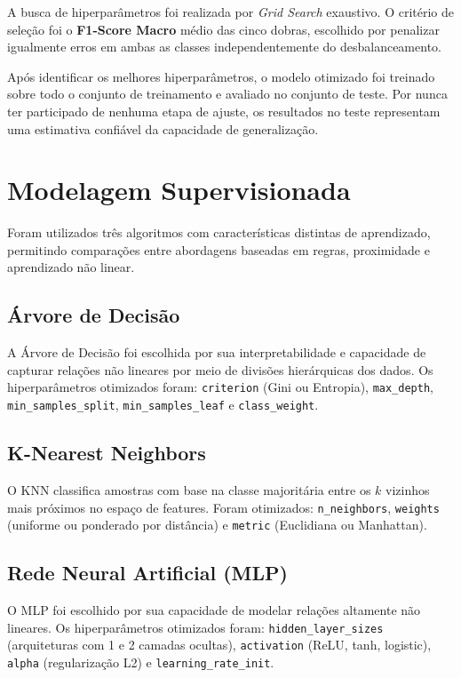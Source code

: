 \documentclass[12pt, a4paper]{article}
\begin{document}
A busca de hiperparâmetros foi realizada por \textit{Grid Search} exaustivo.
O critério de seleção foi o \textbf{F1-Score Macro} médio das cinco dobras,
escolhido por penalizar igualmente erros em ambas as classes
independentemente do desbalanceamento.

Após identificar os melhores hiperparâmetros, o modelo otimizado foi treinado
sobre todo o conjunto de treinamento e avaliado no conjunto de teste. Por nunca
ter participado de nenhuma etapa de ajuste, os resultados no teste representam
uma estimativa confiável da capacidade de generalização.

\section{Modelagem Supervisionada}

Foram utilizados três algoritmos com características distintas de aprendizado,
permitindo comparações entre abordagens baseadas em regras, proximidade e
aprendizado não linear.

\subsection{Árvore de Decisão}

A Árvore de Decisão foi escolhida por sua interpretabilidade e capacidade de
capturar relações não lineares por meio de divisões hierárquicas dos dados.
Os hiperparâmetros otimizados foram: \texttt{criterion} (Gini ou Entropia),
\texttt{max\_depth}, \texttt{min\_samples\_split}, \texttt{min\_samples\_leaf}
e \texttt{class\_weight}.

\subsection{K-Nearest Neighbors}

O KNN classifica amostras com base na classe majoritária entre os $k$ vizinhos
mais próximos no espaço de features. Foram otimizados: \texttt{n\_neighbors},
\texttt{weights} (uniforme ou ponderado por distância) e \texttt{metric}
(Euclidiana ou Manhattan).

\subsection{Rede Neural Artificial (MLP)}

O MLP foi escolhido por sua capacidade de modelar relações altamente não
lineares. Os hiperparâmetros otimizados foram: \texttt{hidden\_layer\_sizes}
(arquiteturas com 1 e 2 camadas ocultas), \texttt{activation} (ReLU, tanh,
logistic), \texttt{alpha} (regularização L2) e \texttt{learning\_rate\_init}.
\end{document}
